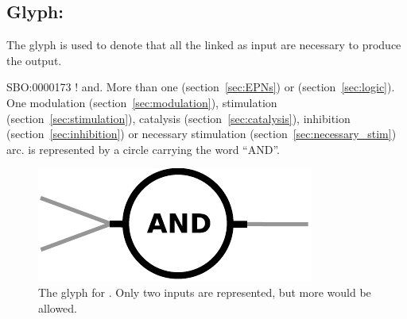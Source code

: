 \subsection{Glyph: }\label{sec:and}

The glyph  is used to denote that all the  linked as input are necessary to produce the output.  

\begin{glyphDescription}
 \glyphSboTerm SBO:0000173 ! and.
 \glyphOrigin More than one  (section~\ref{sec:EPNs}) or  (section~\ref{sec:logic}).
 \glyphTarget  One modulation (section~\ref{sec:modulation}), stimulation (section~\ref{sec:stimulation}), catalysis (section~\ref{sec:catalysis}), inhibition (section~\ref{sec:inhibition}) or necessary stimulation (section~\ref{sec:necessary_stim}) arc.
 \glyphNode {} is represented by a circle carrying the word ``AND''.
\end{glyphDescription}

\begin{figure}[H]
  \centering
  \includegraphics[scale = 0.5]{images/and}
  \caption{The \PD glyph for . Only two inputs are represented, but more would be allowed.}
  \label{fig:and}
\end{figure}


% 
\normalcolor
